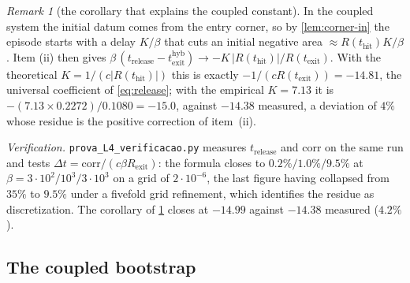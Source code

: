 \documentclass[11pt]{article}
\theoremstyle{definition}
\theoremstyle{remark}
\newtheorem{remark}[remark]{Remark}
\newcommand{\thit}{t_{\mathrm{hit}}}
\newcommand{\texit}{t_{\mathrm{exit}}}
\newcommand{\trel}{t_{\mathrm{release}}}
\newcommand{\hyb}{\mathrm{hyb}}
\begin{document}
\begin{remark}[the corollary that explains the coupled constant]\label{rem:L4cor}
In the coupled system the initial datum comes from the entry corner, so by
\cref{lem:corner-in} the episode starts with a delay $K/\beta$ that cuts an
initial negative area $\approx R(\thit)K/\beta$. Item (ii) then gives
$\beta\,(\trel-\texit^{\hyb})\to-K\,|R(\thit)|/R(\texit)$. With the theoretical
$K=1/(c|R(\thit)|)$ this is exactly $-1/(cR(\texit))=-14.81$, the universal
coefficient of \eqref{eq:release}; with the empirical $K=7.13$ it is
$-(7.13\times0.2272)/0.1080=-15.0$, against $-14.38$ measured, a deviation of
$4\%$ whose residue is the positive correction of item~(ii).
\end{remark}

\noindent\emph{Verification.} \texttt{prova\_L4\_verificacao.py} measures $\trel$
and $\mathrm{corr}$ on the same run and tests
$\Delta t=\mathrm{corr}/(c\beta R_{\mathrm{exit}})$: the formula closes to
$0.2\%/1.0\%/9.5\%$ at $\beta=3\cdot10^2/10^3/3\cdot10^3$ on a grid of
$2\cdot10^{-6}$, the last figure having collapsed from $35\%$ to $9.5\%$ under a
fivefold grid refinement, which identifies the residue as discretization. The
corollary of \cref{rem:L4cor} closes at $-14.99$ against $-14.38$ measured
($4.2\%$).

\subsection{The coupled bootstrap}\label{app:L5}
\end{document}
